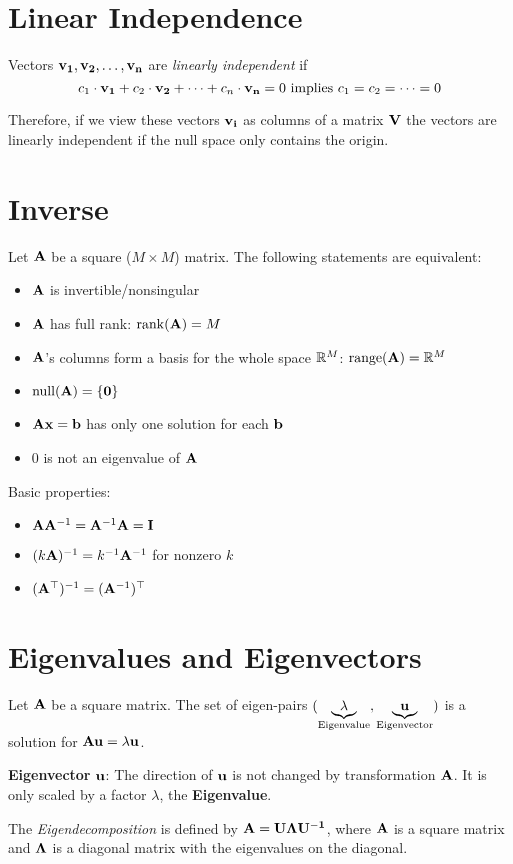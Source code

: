 \section{Linear Independence}
Vectors \(\mathbf{v_1}, \mathbf{v_2}, \ldots, \mathbf{v_n}\) are \textit{linearly independent} if
\[c_1 \cdot \mathbf{v_1} + c_2 \cdot \mathbf{v_2} + \cdots + c_n \cdot \mathbf{v_n} = 0 \text{ implies } c_1 = c_2 = \cdots = 0\]

Therefore, if we view these vectors \(\mathbf{v_i}\) as columns of a matrix \(\mathbf{V}\) the vectors are linearly independent if the null space only contains the origin.

\section{Inverse}
Let \(\mathbf{A}\) be a square (\(M \times M\)) matrix. The following statements are equivalent:
\begin{itemize}
\item \(\mathbf{A}\) is invertible/nonsingular
\item \(\mathbf{A}\) has full rank: \(\operatorname{rank}(\mathbf{A}) = M\)
\item \(\mathbf{A}\)'s columns form a basis for the whole space \(\mathbb{R}^M\): \(\operatorname{range}(\mathbf{A}) = \mathbb{R}^M\)
\item \(\operatorname{null}(\mathbf{A}) = \{\mathbf{0}\}\)
\item \(\mathbf{Ax} = \mathbf{b}\) has only one solution for each \(\mathbf{b}\)
\item \(0\) is not an eigenvalue of \(\mathbf{A}\)
\end{itemize}

Basic properties:
\begin{itemize}
\item \(\mathbf{A}\mathbf{A}^{-1} = \mathbf{A}^{-1}\mathbf{A} = \mathbf{I}\)
\item \((k\mathbf{A})^{-1} = k^{-1}\mathbf{A}^{-1}\) for nonzero \(k\)
\item \((\mathbf{A}^\top)^{-1} = (\mathbf{A}^{-1})^\top\)
\end{itemize}

\section{Eigenvalues and Eigenvectors}
\begin{definition}
Let \(\mathbf{A}\) be a square matrix. The set of eigen-pairs \((\underbrace{\lambda}_\text{Eigenvalue}, \underbrace{\mathbf{u}}_\text{Eigenvector})\) is a solution for \(\mathbf{Au} = \lambda\mathbf{u}\).

\textbf{Eigenvector} \(\mathbf{u}\): The direction of \(\mathbf{u}\) is not changed by transformation \(\mathbf{A}\). It is only scaled by a factor \(\lambda\), the \textbf{Eigenvalue}.
\end{definition}

\begin{definition}[Eigendecomposition]
The \textit{Eigendecomposition} is defined by \(\mathbf{A} = \mathbf{U \Lambda U^{-1}}\), where \(\mathbf{A}\) is a square matrix and \(\mathbf{\Lambda}\) is a diagonal matrix with the eigenvalues on the diagonal.
\end{definition}
